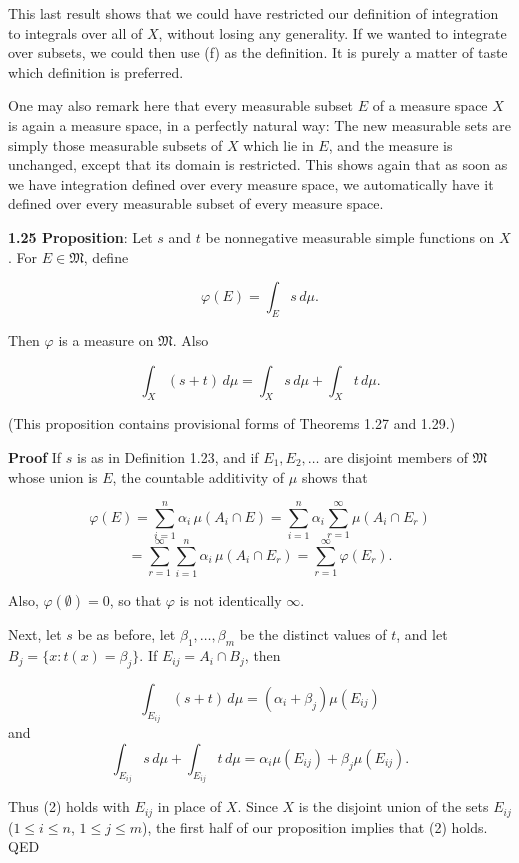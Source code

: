 \documentclass[11pt]{article}
\begin{document}
This last result shows that we could have restricted our definition of integration to integrals over all of \(X\), without losing any generality. If we wanted to integrate over subsets, we could then use (f) as the definition. It is purely a matter of taste which definition is preferred.

One may also remark here that every measurable subset \(E\) of a measure space \(X\) is again a measure space, in a perfectly natural way: The new measurable sets are simply those measurable subsets of \(X\) which lie in \(E\), and the measure is unchanged, except that its domain is restricted. This shows again that as soon as we have integration defined over every measure space, we automatically have it defined over every measurable subset of every measure space.

\label{org39a92af}
\textbf{\textbf{1.25 Proposition}}: Let \(s\) and \(t\) be nonnegative measurable simple functions on \(X\). For \(E \in \mathfrak{M}\), define

\[
\varphi(E) = \int_{E} s \, d\mu.\tag{1}
\]

Then \(\varphi\) is a measure on \(\mathfrak{M}\). Also

\[
\int_{X} (s + t) \, d\mu = \int_{X} s \, d\mu + \int_{X} t \, d\mu. \tag{2}
\]

(This proposition contains provisional forms of Theorems 1.27 and 1.29.)

\textbf{\textbf{Proof}} If \(s\) is as in Definition 1.23, and if \(E_{1}, E_{2}, \ldots\) are disjoint members of \(\mathfrak{M}\) whose union is \(E\), the countable additivity of \(\mu\) shows that

\[
\varphi(E) = \sum_{i=1}^{n} \alpha_{i} \, \mu(A_{i} \cap E) = \sum_{i=1}^{n} \alpha_{i} \sum_{r=1}^{\infty} \mu(A_{i} \cap E_{r})
\]
\[
= \sum_{r=1}^{\infty} \sum_{i=1}^{n} \alpha_{i} \, \mu(A_{i} \cap E_{r}) = \sum_{r=1}^{\infty} \varphi(E_{r}).
\]

Also, \(\varphi(\emptyset) = 0\), so that \(\varphi\) is not identically \(\infty\).

Next, let \(s\) be as before, let \(\beta_{1}, \ldots, \beta_{m}\) be the distinct values of \(t\), and let \(B_{j} = \{x \colon t(x) = \beta_{j}\}\). If \(E_{ij} = A_{i} \cap B_{j}\), then

\[
\int_{E_{ij}} (s + t) \, d\mu = (\alpha_{i} + \beta_{j}) \mu(E_{ij})
\]
and
\[
\int_{E_{ij}} s \, d\mu + \int_{E_{ij}} t \, d\mu = \alpha_{i} \mu(E_{ij}) + \beta_{j} \mu(E_{ij}).
\]

Thus (2) holds with \(E_{ij}\) in place of \(X\). Since \(X\) is the disjoint union of the sets \(E_{ij}\) (\(1 \leq i \leq n\), \(1 \leq j \leq m\)), the first half of our proposition implies that (2) holds. QED
\end{document}
